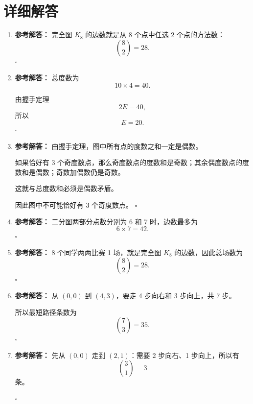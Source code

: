 \documentclass[11pt,a4paper,fontset=fandol]{ctexart}
\newenvironment{solution}{\par\noindent\textbf{参考解答：}}{\hfill$\square$\par}
\begin{document}
\newpage
\section{详细解答}

\begin{enumerate}
  \item \begin{solution}
  完全图 $K_8$ 的边数就是从 8 个点中任选 2 个点的方法数：
  \[
  \binom82=28.
  \]
  \end{solution}

  \item \begin{solution}
  总度数为
  \[
  10\times 4=40.
  \]

  由握手定理
  \[
  2E=40,
  \]
  所以
  \[
  E=20.
  \]
  \end{solution}

  \item \begin{solution}
  由握手定理，图中所有点的度数之和一定是偶数。

  如果恰好有 3 个奇度数点，那么奇度数点的度数和是奇数；其余偶度数点的度数和是偶数；奇数加偶数仍是奇数。

  这就与总度数和必须是偶数矛盾。

  因此图中不可能恰好有 3 个奇度数点。
  \end{solution}

  \item \begin{solution}
  二分图两部分点数分别为 6 和 7 时，边数最多为
  \[
  6\times 7=42.
  \]
  \end{solution}

  \item \begin{solution}
  8 个同学两两比赛 1 场，就是完全图 $K_8$ 的边数，因此总场数为
  \[
  \binom82=28.
  \]
  \end{solution}

  \item \begin{solution}
  从 $(0,0)$ 到 $(4,3)$，要走 4 步向右和 3 步向上，共 7 步。

  所以最短路径条数为
  \[
  \binom73=35.
  \]
  \end{solution}

  \item \begin{solution}
  先从 $(0,0)$ 走到 $(2,1)$：需要 2 步向右、1 步向上，所以有
  \[
  \binom31=3
  \]
  条。


\end{solution}
\end{enumerate}
\end{document}
